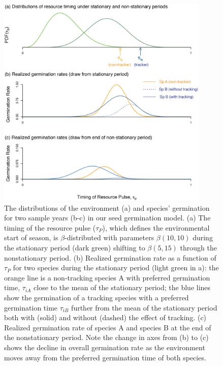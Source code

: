 \documentclass[11pt,letterpaper]{article}
\begin{document}
\begin{figure}[t!]
\centering
\includegraphics[width=0.9\textwidth]{..//..//R/graphs/conceptual/TauP_GerminationAdj.png} 
\caption{The distributions of the environment (a) and species' germination for two sample years (b-c) in our seed germination model. (a) The timing of the resource pulse ($\tau_P$), which defines the environmental start of season, is $\beta$-distributed with parameters $\beta(10,10)$ during the stationary period (dark green) shifting to $\beta (5,15)$ through the nonstationary period. (b) Realized germination rate as a function of $\tau_P$ for two species during the stationary period (light green in a): the orange line is a non-tracking species A with preferred germination time, $\tau_{iA}$ close to the mean of the stationary period; the blue lines show the germination of a tracking species with a preferred germination time $\tau_{iB}$ further from the mean of the stationary period both with (solid) and without (dashed) the effect of tracking. (c) Realized germination rate of species A and species B at the end of the nonstationary period. Note the change in axes from (b) to (c) shows the decline in overall germination rate as the environment moves away from the preferred germination time of both species.} %

 \label{fig:concept}
\end{figure}
\end{document}
